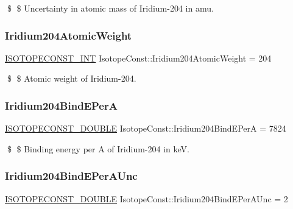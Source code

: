 \$ \$ Uncertainty in atomic mass of Iridium-\/204 in amu. \mbox{\label{group___isotope_const-_iridium-_ir204_gaa93f154e59e5fa6ec9f0110e82fc2b98}} 
\subsubsection{\texorpdfstring{Iridium204\+Atomic\+Weight}{Iridium204AtomicWeight}}
{\footnotesize\ttfamily \mbox{\hyperlink{group___isotope_const-_macros_ga5f18360b3e99483a35c32d789e62621c}{I\+S\+O\+T\+O\+P\+E\+C\+O\+N\+S\+T\+\_\+\+I\+NT}} Isotope\+Const\+::\+Iridium204\+Atomic\+Weight = 204}

\$ \$ Atomic weight of Iridium-\/204. \mbox{\label{group___isotope_const-_iridium-_ir204_ga85a4bf7c1cdcc445f0d743a6b3dc6fa0}} 
\subsubsection{\texorpdfstring{Iridium204\+Bind\+E\+PerA}{Iridium204BindEPerA}}
{\footnotesize\ttfamily \mbox{\hyperlink{group___isotope_const-_macros_ga8f45a7272ce02c0b4c65c44636ed719a}{I\+S\+O\+T\+O\+P\+E\+C\+O\+N\+S\+T\+\_\+\+D\+O\+U\+B\+LE}} Isotope\+Const\+::\+Iridium204\+Bind\+E\+PerA = 7824}

\$ \$ Binding energy per A of Iridium-\/204 in keV. \mbox{\label{group___isotope_const-_iridium-_ir204_gafc8678f5ae52c18307a790cde1d2717a}} 
\subsubsection{\texorpdfstring{Iridium204\+Bind\+E\+Per\+A\+Unc}{Iridium204BindEPerAUnc}}
{\footnotesize\ttfamily \mbox{\hyperlink{group___isotope_const-_macros_ga8f45a7272ce02c0b4c65c44636ed719a}{I\+S\+O\+T\+O\+P\+E\+C\+O\+N\+S\+T\+\_\+\+D\+O\+U\+B\+LE}} Isotope\+Const\+::\+Iridium204\+Bind\+E\+Per\+A\+Unc = 2}

